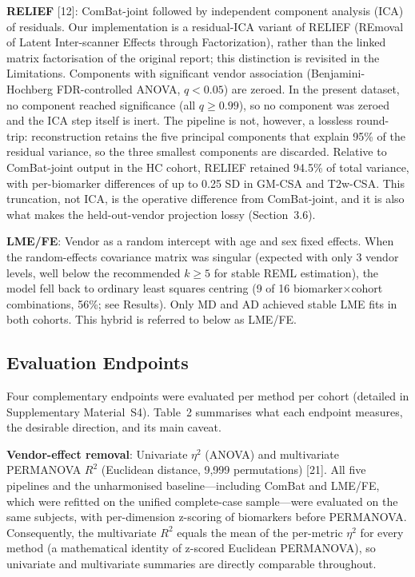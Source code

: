 \documentclass[12pt,a4paper]{article}
\begin{document}
\textbf{RELIEF} [12]: ComBat-joint followed by independent component analysis (ICA) of residuals. Our implementation is a residual-ICA variant of RELIEF (REmoval of Latent Inter-scanner Effects through Factorization), rather than the linked matrix factorisation of the original report; this distinction is revisited in the Limitations. Components with significant vendor association (Benjamini-Hochberg FDR-controlled ANOVA, $q<0.05$) are zeroed. In the present dataset, no component reached significance (all $q\geq0.99$), so no component was zeroed and the ICA step itself is inert. The pipeline is not, however, a lossless round-trip: reconstruction retains the five principal components that explain 95\% of the residual variance, so the three smallest components are discarded. Relative to ComBat-joint output in the HC cohort, RELIEF retained 94.5\% of total variance, with per-biomarker differences of up to 0.25 SD in GM-CSA and T2w-CSA. This truncation, not ICA, is the operative difference from ComBat-joint, and it is also what makes the held-out-vendor projection lossy (Section~3.6).

\textbf{LME/FE}: Vendor as a random intercept with age and sex fixed effects. When the random-effects covariance matrix was singular (expected with only 3 vendor levels, well below the recommended $k\geq5$ for stable REML estimation), the model fell back to ordinary least squares centring (9 of 16 biomarker$\times$cohort combinations, 56\%; see Results). Only MD and AD achieved stable LME fits in both cohorts. This hybrid is referred to below as LME/FE.

\subsection{Evaluation Endpoints}

Four complementary endpoints were evaluated per method per cohort (detailed in Supplementary Material~S4). Table~2 summarises what each endpoint measures, the desirable direction, and its main caveat.

\textbf{Vendor-effect removal}: Univariate $\eta^2$ (ANOVA) and multivariate PERMANOVA $R^2$ (Euclidean distance, 9,999 permutations) [21]. All five pipelines and the unharmonised baseline---including ComBat and LME/FE, which were refitted on the unified complete-case sample---were evaluated on the same subjects, with per-dimension z-scoring of biomarkers before PERMANOVA. Consequently, the multivariate $R^2$ equals the mean of the per-metric $\eta^2$ for every method (a mathematical identity of z-scored Euclidean PERMANOVA), so univariate and multivariate summaries are directly comparable throughout.
\end{document}
